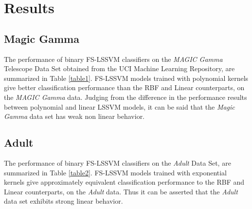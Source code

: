 \section{Results}

\subsection*{Magic Gamma}
The performance of binary FS-LSSVM classifiers on the \textit{MAGIC Gamma} Telescope Data Set obtained from the UCI Machine Learning Repository, are summarized in Table \ref{table1}. FS-LSSVM models trained with polynomial kernels give better classification performance than the RBF and Linear counterparts, on the \textit{MAGIC Gamma} data. Judging from the difference in the performance results between polynomial and linear LSSVM models, it can be said that the \textit{Magic Gamma} data set has weak non linear behavior.
 
\begin{table*}[!htbp]
\caption{Magic Gamma Test Results}
\begin{center}
\end{center}
\end{table*}

\subsection*{Adult}
The performance of binary FS-LSSVM classifiers on the \textit{Adult} Data Set, are summarized in Table \ref{table2}. FS-LSSVM models trained with exponential kernels give approximately equivalent classification performance to the RBF and Linear counterparts, on the \textit{Adult} data. Thus it can be asserted that the \emph{Adult} data set exhibits strong linear behavior.

